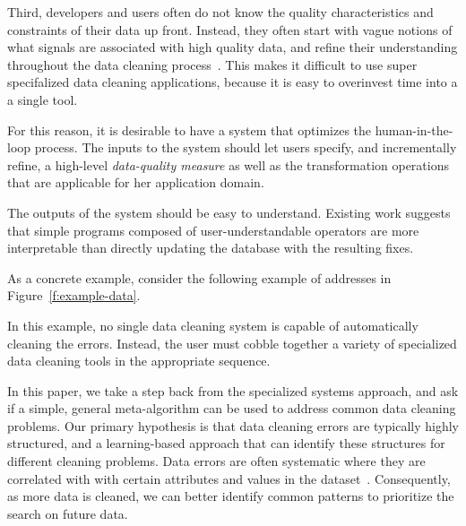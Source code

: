 Third, developers and users often do not know the quality characteristics and constraints of their data up front.  Instead, they often start with vague notions of what signals are associated with high quality data, and refine their understanding throughout the data cleaning process~\cite{}.  This makes it difficult to use super specifalized data cleaning applications, because it is easy to overinvest time into a a single tool.   


For this reason, it is desirable to have a system that optimizes the human-in-the-loop process.  The inputs to the system should let users specify, and incrementally refine, a high-level {\it data-quality measure} as well as the transformation operations that are applicable for her application domain.  

The outputs of the system should be easy to understand.  Existing work suggests that simple programs composed of user-understandable operators are more interpretable than directly updating the database with the resulting fixes.  

As a concrete example, consider the following example of addresses in Figure~\ref{f:example-data}.  

In this example, no single data cleaning system is capable of automatically cleaning the errors.  Instead, the user must cobble together a variety of specialized data cleaning tools in the appropriate sequence.

In this paper, we take a step back from the specialized systems approach, and ask if a simple, general meta-algorithm can be used to address common data cleaning problems.  Our primary hypothesis is that data cleaning errors are typically highly structured, and a learning-based approach that can identify these structures for different cleaning problems.   
Data errors are often systematic where they are correlated with with certain attributes and values in the dataset~\cite{rekatsinas2017holoclean,DBLP:journals/pvldb/KrishnanWWFG16}.
Consequently, as more data is cleaned, we can better identify common patterns to prioritize the search on future data.

